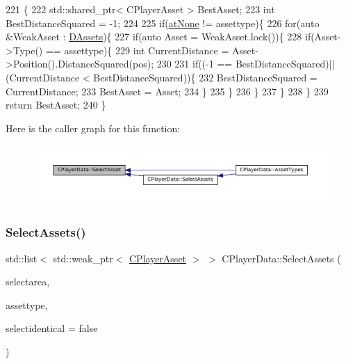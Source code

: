 \begin{DoxyCode}
221                                                                                               \{
222     std::shared\_ptr< CPlayerAsset > BestAsset;
223     \textcolor{keywordtype}{int} BestDistanceSquared = -1;
224     
225     \textcolor{keywordflow}{if}(\hyperlink{GameDataTypes_8h_a5600d4fc433b83300308921974477feca82fb51718e2c00981a2d37bc6fe92593}{atNone} != assettype)\{
226         \textcolor{keywordflow}{for}(\textcolor{keyword}{auto} &WeakAsset : \hyperlink{classCPlayerData_a1d7dd355facf52db6242e3554373906c}{DAssets})\{
227             \textcolor{keywordflow}{if}(\textcolor{keyword}{auto} Asset = WeakAsset.lock())\{
228                 \textcolor{keywordflow}{if}(Asset->Type() == assettype)\{
229                     \textcolor{keywordtype}{int} CurrentDistance = Asset->Position().DistanceSquared(pos);
230                     
231                     \textcolor{keywordflow}{if}((-1 == BestDistanceSquared)||(CurrentDistance < BestDistanceSquared))\{
232                         BestDistanceSquared = CurrentDistance;
233                         BestAsset = Asset;
234                     \}
235                 \}
236             \}
237         \}
238     \}
239     \textcolor{keywordflow}{return} BestAsset;
240 \}
\end{DoxyCode}
Here is the caller graph for this function\+:\nopagebreak
\begin{figure}[H]
\begin{center}
\leavevmode
\includegraphics[width=350pt]{classCPlayerData_a1c926b101513f871ec85e34ac3c83ec4_icgraph}
\end{center}
\end{figure}
\hypertarget{classCPlayerData_afb3303a53687383e4101d4de37391d84}{}\label{classCPlayerData_afb3303a53687383e4101d4de37391d84} 
\subsubsection{\texorpdfstring{Select\+Assets()}{SelectAssets()}}
{\footnotesize\ttfamily std\+::list$<$ std\+::weak\+\_\+ptr$<$ \hyperlink{classCPlayerAsset}{C\+Player\+Asset} $>$ $>$ C\+Player\+Data\+::\+Select\+Assets (\begin{DoxyParamCaption}\item[{const \hyperlink{structSRectangle}{S\+Rectangle} \&}]{selectarea,  }\item[{\hyperlink{GameDataTypes_8h_a5600d4fc433b83300308921974477fec}{E\+Asset\+Type}}]{assettype,  }\item[{bool}]{selectidentical = {\ttfamily false} }\end{DoxyParamCaption})}



